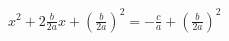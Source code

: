 \documentclass[preview]{standalone}
\begin{document}
\begin{center}
$x^2 + 2\frac{b}{2a}x + \left( \frac{b}{2a} \right)^2 = - \frac{c}{a} + \left( \frac{b}{2a} \right)^2$
\end{center}
\end{document}
